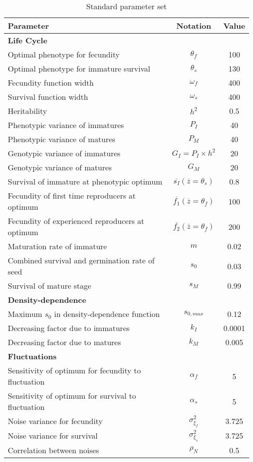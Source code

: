 \begin{table}
\begin{center}
	\begin{tabular}{l c c}
		\hline \hline
		Parameter & Notation & Value \\
		\hline
		\multicolumn{3}{l}{\textbf{Life Cycle}} \\
		Optimal phenotype for fecundity & $\theta_{f}$ & 100 \\
		Optimal phenotype for immature survival & $\theta_{s}$ & 130 \\
		Fecundity function width & $\omega_{f}$ & 400 \\
		Survival function width & $\omega_{s}$ & 400 \\
		Heritability & $h^2$ & 0.5 \\
		Phenotypic variance of immatures & $P_{I}$ & 40 \\
		Phenotypic variance of matures & $P_{M}$ & 40 \\
		Genotypic variance of immatures & $G_{I} = P_{I} \times h^2$ & 20 \\
		Genotypic variance of matures & $G_{M}$ & 20 \\
		Survival of immature at phenotypic optimum & $\overline{s_{I}}(\overline{z} = \theta_{s})$ & 0.8 \\
		Fecundity of first time reproducers at optimum & $\overline{f_{1}}(\overline{z} = \theta_{f})$ & 100 \\
		Fecundity of experienced reproducers at optimum & $\overline{f_{2}}(\overline{z} = \theta_{f})$ & 200 \\
		Maturation rate of immature & $m$ & 0.02 \\
		Combined survival and germination rate of seed & $s_{0}$ & 0.03 \\
		Survival of mature stage & $s_{M}$ & 0.99 \\
		\multicolumn{3}{l}{\textbf{Density-dependence}} \\
		Maximum $s_{0}$ in density-dependence function & $s_{0, max}$ & 0.12 \\
		Decreasing factor due to immatures & $k_{I}$ & 0.0001 \\
		Decreasing factor due to matures & $k_{M}$ & 0.005 \\
		\multicolumn{3}{l}{\textbf{Fluctuations}} \\
		Sensitivity of optimum for fecundity to fluctuation & $\alpha_{f}$ & 5 \\
		Sensitivity of optimum for survival to fluctuation & $\alpha_{s}$ & 5 \\
		Noise variance for fecundity & $\sigma_{\xi_{f}}^2$ & 3.725 \\
		Noise variance for survival & $\sigma_{\xi_{s}}^2$ & 3.725 \\
		Correlation between noises & $\rho_{N}$ & 0.5 \\
		\hline \hline
	\end{tabular}
	\caption{Standard parameter set}
	\label{tab:params}
\end{center}
\end{table}

